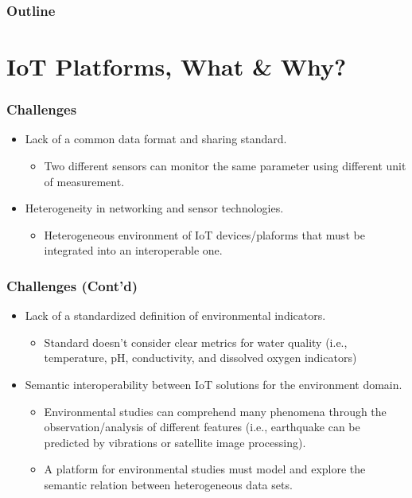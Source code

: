 \documentclass{../iot-lecture}
\subtitle{IoT Platforms}
\begin{document}
\begin{frame}
  \titlepage{}
\end{frame}
\begin{frame}
  \frametitle{Outline}
  \tableofcontents{}
\end{frame}

\section{IoT Platforms, What \& Why?}

\begin{frame}
  \frametitle{Challenges}
  \begin{itemize}
    \item Lack of a common data format and sharing standard.
    \begin{itemize}
      \item Two different sensors can monitor the same parameter using different unit of measurement.
    \end{itemize}
    \item Heterogeneity in networking and sensor technologies.
    \begin{itemize}
      \item Heterogeneous environment of IoT devices/plaforms that must be integrated into an interoperable one.
    \end{itemize}
  \end{itemize}
\end{frame}

\begin{frame}
  \frametitle{Challenges (Cont'd)}
  \begin{itemize}
    \item Lack of a standardized definition of environmental indicators.
    \begin{itemize}
      \item Standard doesn't consider clear metrics for water quality (i.e., temperature, pH, conductivity, and dissolved oxygen indicators)
    \end{itemize}
    \item Semantic interoperability between IoT solutions for the environment domain.
    \begin{itemize}
      \item Environmental studies can comprehend many phenomena through the observation/analysis of different features
        (i.e., earthquake can be predicted by vibrations or satellite image processing).
      \item A platform for environmental studies must model and explore the semantic relation between heterogeneous data sets.
    \end{itemize}
  \end{itemize}
\end{frame}
\end{document}
